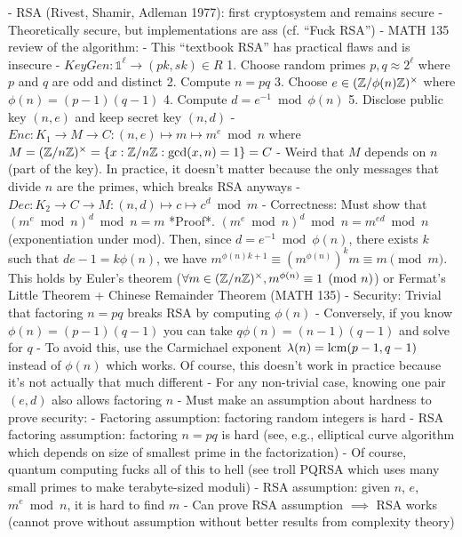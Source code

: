 \documentclass[notes]{agony}
\begin{document}
\begin{markdown}
- RSA (Rivest, Shamir, Adleman 1977): first cryptosystem and remains secure
- Theoretically secure, but implementations are ass (cf. ``Fuck RSA'')
- MATH 135 review of the algorithm:
    - This ``textbook RSA'' has practical flaws and is insecure
    - $KeyGen : \mathbb{1}^\ell \to (pk, sk) \in R$
        1. Choose random primes $p,q \approx 2^\ell$ where $p$ and $q$ are odd and distinct
        2. Compute $n = pq$
        3. Choose $e \in (\mathbb{Z} / \phi(n)\mathbb{Z})^\times$ where $\phi(n) = (p-1)(q-1)$
        4. Compute $d = e^{-1} \bmod \phi(n)$
        5. Disclose public key $(n,e)$ and keep secret key $(n,d)$
    - $Enc : K_1 \to M \to C : (n,e) \mapsto m \mapsto m^e \bmod n$ where $M = (\mathbb{Z}/n\mathbb{Z})^\times = \{ x : \mathbb{Z} / n\mathbb{Z} : \gcd(x,n) = 1\} = C$
        - Weird that $M$ depends on $n$ (part of the key). In practice, it doesn't matter because the only messages that divide $n$ are the primes, which breaks RSA anyways
    - $Dec : K_2 \to C \to M : (n,d) \mapsto c \mapsto c^d \bmod m$
- Correctness: Must show that $(m^e \bmod n)^d \bmod n = m$
    *Proof*. $(m^e \bmod n)^d \bmod n = m^{ed} \bmod n$ (exponentiation under mod). Then, since $d = e^{-1} \bmod \phi(n)$, there exists $k$ such that $de - 1 = k\phi(n)$, we have $m^{\phi(n)k + 1} \equiv (m^{\phi(n)})^km \equiv m \pmod{m}$. This holds by Euler's theorem ($\forall m \in (\mathbb{Z}/n\mathbb{Z})^\times, m^{\phi(n)} \equiv 1 \pmod n$) or Fermat's Little Theorem + Chinese Remainder Theorem (MATH 135)
- Security: Trivial that factoring $n=pq$ breaks RSA by computing $\phi(n)$
    - Conversely, if you know $\phi(n) = (p-1)(q-1)$ you can take $q\phi(n) = (n-1)(q-1)$ and solve for $q$
        - To avoid this, use the Carmichael exponent $\lambda(n) = \operatorname{lcm}(p-1,q-1)$ instead of $\phi(n)$ which works. Of course, this doesn't work in practice because it's not actually that much different
    - For any non-trivial case, knowing one pair $(e,d)$ also allows factoring $n$
    - Must make an assumption about hardness to prove security:
        - Factoring assumption: factoring random integers is hard
        - RSA factoring assumption: factoring $n=pq$ is hard (see, e.g., elliptical curve algorithm which depends on size of smallest prime in the factorization)
            - Of course, quantum computing fucks all of this to hell (see troll PQRSA which uses many small primes to make terabyte-sized moduli)
        - RSA assumption: given $n$, $e$, $m^e\bmod n$, it is hard to find $m$
    - Can prove RSA assumption $\implies$ RSA works (cannot prove without assumption without better results from complexity theory)


\end{markdown}
\end{document}
